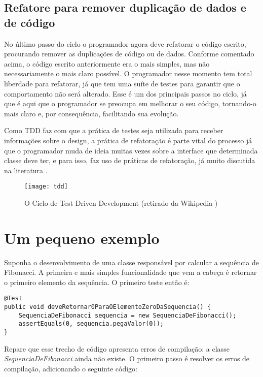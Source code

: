 \subsection{Refatore para remover duplicação de dados e de código}

No último passo do ciclo o programador agora deve refatorar o código escrito, procurando remover as duplicações de código ou de dados. 
Conforme comentado acima, o código escrito anteriormente era o mais simples, mas não necessariamente o mais claro possível. O programador
nesse momento tem total liberdade para refatorar, já que tem uma suíte de testes para garantir que o comportamento não será alterado.
Esse é um dos principais passos no ciclo, já que é aqui que o programador se preocupa em melhorar o seu código, tornando-o
mais claro e, por consequência, facilitando sua evolução.

Como TDD faz com que a prática de testes seja utilizada para receber informações sobre o design, 
a prática de refatoração é parte vital do processo já que o programador muda de ideia muitas vezes sobre a interface que determinada
classe deve ter, e para isso, faz uso de práticas de refatoração, já muito discutida na literatura \cite{fowler-refactoring} \cite{joshua-refactoring}.

\begin{figure}
  \centering
  \texttt{[image: tdd]}
  \caption{O Ciclo de Test-Driven Development (retirado da Wikipedia \cite{figura-tdd-wiki}) }
  \label{fig:tdd}
\end{figure}

\section{Um pequeno exemplo}
\label{sec:tdd-exemplo}

Suponha o desenvolvimento de uma classe responsável por calcular a sequência de Fibonacci. A primeira e mais simples funcionalidade que
vem a cabeça é retornar o primeiro elemento da sequência. O primeiro teste então é:

\begin{lstlisting}[frame=trbl]
@Test
public void deveRetornar0ParaOElementoZeroDaSequencia() {
	SequenciaDeFibonacci sequencia = new SequenciaDeFibonacci();
	assertEquals(0, sequencia.pegaValor(0));
}
\end{lstlisting}

Repare que esse trecho de código apresenta erros de compilação: a classe \textit{SequenciaDeFibonacci} ainda não existe. O primeiro
passo é resolver os erros de compilação, adicionando o seguinte código:

